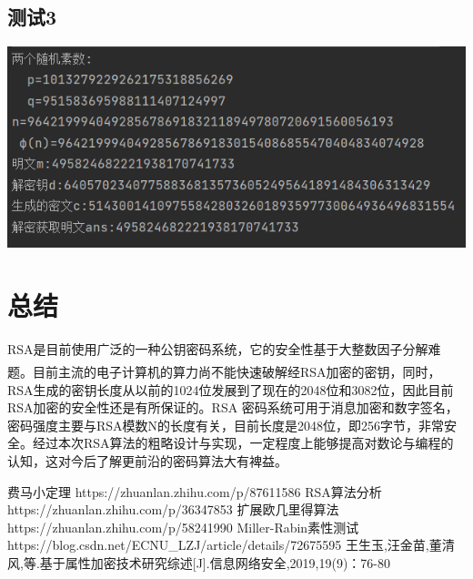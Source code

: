 \documentclass[UTF8,a4paper,10.5pt,twocolumn]{ctexart}
\newcommand{\upcite}[1]{\textsuperscript{\textsuperscript{\cite{#1}}}}
\begin{document}
	\subsection{测试3}

	
\centerline{\includegraphics[scale=0.65]{测试3.png}} 





\section{总结}
	\par RSA是目前使用广泛的一种公钥密码系统，它的安全性基于大整数因子分解难题\upcite{5}。目前主流的电子计算机的算力尚不能快速破解经RSA加密的密钥，同时，RSA生成的密钥长度从以前的1024位发展到了现在的2048位和3082位，因此目前RSA加密的安全性还是有所保证的。RSA 密码系统可用于消息加密和数字签名，密码强度主要与RSA模数N的长度有关，目前长度是2048位，即256字节，非常安全。经过本次RSA算法的粗略设计与实现，一定程度上能够提高对数论与编程的认知，这对今后了解更前沿的密码算法大有裨益。

\begin{thebibliography}{5}
	费马小定理 https://zhuanlan.zhihu.com/p/87611586
	RSA算法分析 https://zhuanlan.zhihu.com/p/36347853
	扩展欧几里得算法 https://zhuanlan.zhihu.com/p/58241990
	Miller-Rabin素性测试 https://blog.csdn.net/ECNU\_LZJ/article/details/72675595
	王生玉,汪金苗,董清风,等.基于属性加密技术研究综述[J].信息网络安全,2019,19(9)：76-80
\end{thebibliography}

 
\end{document}
